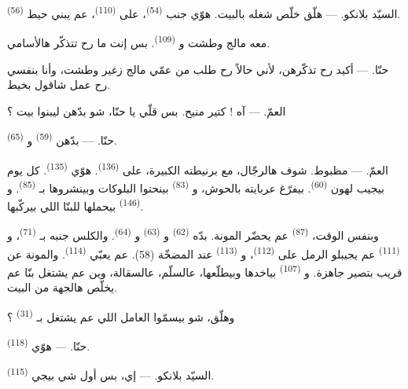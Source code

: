 \textsc{السيّد بلانكو}. --- هلّق خلّص شغله بالبيت. هوّي جنب
 \textsuperscript{(54)}، على  \textsuperscript{(110)}،
عم يبني حيط  \textsuperscript{(56)}.

معه مالج وطشت و \textsuperscript{(109)}. بس إنت ما رح تتذكّر
هالأسامي.

\textsc{حنّا}. --- أكيد رح تذكّرهن، لأني حالاً رح طلب من عمّي مالج
زغير وطشت، وأنا بنفسي رح عمل شاقول بخيط.

\VUsaut{3.0mm}
\VUsaut{3.0mm}

\textsc{العمّ}. --- آه ! كتير منيح. بس قلّي يا حنّا، شو بدّهن ليبنوا
بيت ؟

\textsc{حنّا}. --- بدّهن  \textsuperscript{(59)}
و \textsuperscript{(65)}.

\textsc{العمّ}. --- مظبوط. شوف هالرجّال، مع برنيطته الكبيرة، على
 \textsuperscript{(136)}. هوّي 
\textsuperscript{(135)}. كل يوم بيجيب لهون 
\textsuperscript{(60)}. بيفرّغ عربايته بالحوش، و
\textsuperscript{(83)} بينحتوا البلوكات وبينشروها بـ
\textsuperscript{(85)}. و \textsuperscript{(146)} بيحملها للبنّا
اللي بيركّبها.

وبنفس الوقت،  \textsuperscript{(87)} عم يحضّر المونة.
بدّه  \textsuperscript{(62)} و \textsuperscript{(63)}
و \textsuperscript{(64)}. والكلس جنبه بـ
\textsuperscript{(71)}، و \textsuperscript{(111)} عم
يجيبلو الرمل على  \textsuperscript{(112)}،
و \textsuperscript{(113)} عند المضخّة (58). عم يعبّي
 \textsuperscript{(114)}. والمونة عن قريب بتصير جاهزة.
و \textsuperscript{(107)} بياخدها وبيطلّعها، عالسلّم،
عالسقالة، وين عم يشتغل بنّا عم يخلّص هالجهة من البيت.

وهلّق، شو بيسمّوا العامل اللي عم يشتغل بـ
\textsuperscript{(31)} ؟

\textsc{حنّا}. --- هوّي  \textsuperscript{(118)}.

\VUsaut{3.0mm}
\VUsaut{3.0mm}

\textsc{السيّد بلانكو}. --- إي، بس أول شي بيجي 
\textsuperscript{(115)}.

